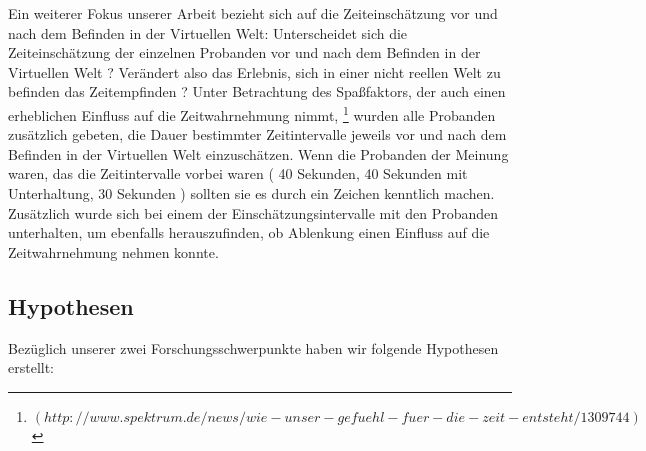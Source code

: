 \documentclass{Paper}
\begin{document}
Ein weiterer Fokus unserer Arbeit bezieht sich auf die Zeiteinschätzung vor und nach dem Befinden in der Virtuellen Welt: Unterscheidet sich die Zeiteinschätzung der einzelnen Probanden vor und nach dem Befinden in der Virtuellen Welt ? Verändert also das Erlebnis, sich in einer nicht reellen Welt zu befinden das Zeitempfinden ? Unter Betrachtung des Spaßfaktors, der auch einen erheblichen Einfluss auf die Zeitwahrnehmung nimmt, \footnote{$( http://www.spektrum.de/news/wie-unser-gefuehl-fuer-die-zeit-entsteht/1309744)$} wurden alle Probanden zusätzlich gebeten, die Dauer bestimmter Zeitintervalle jeweils vor und nach dem Befinden in der Virtuellen Welt einzuschätzen. Wenn die Probanden der Meinung waren, das die Zeitintervalle vorbei waren ( 40 Sekunden, 40 Sekunden mit Unterhaltung, 30 Sekunden ) sollten sie es durch ein Zeichen kenntlich machen. Zusätzlich wurde sich bei einem der Einschätzungsintervalle mit den Probanden unterhalten, um ebenfalls herauszufinden, ob Ablenkung einen Einfluss auf die Zeitwahrnehmung nehmen konnte. 

\subsection{Hypothesen}

Bezüglich unserer zwei Forschungsschwerpunkte haben wir folgende Hypothesen erstellt:
\end{document}
